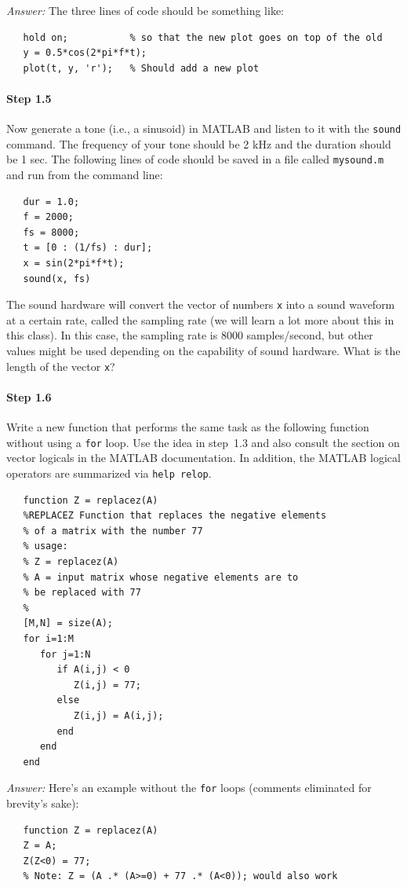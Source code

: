 \ifanswers
\textit{Answer:} The three lines of code should be something like:
\begin{verbatim}
   hold on;           % so that the new plot goes on top of the old
   y = 0.5*cos(2*pi*f*t);
   plot(t, y, 'r');   % Should add a new plot
\end{verbatim}
\fi

\paragraph{Step 1.5} Now generate a tone (i.e., a sinusoid) in MATLAB
and listen to it with the \texttt{sound} command. The frequency of
your tone should be 2 kHz and the duration should be 1 sec. The
following lines of code should be saved in a file called
\texttt{mysound.m} and run from the command line:
\begin{verbatim}
   dur = 1.0;
   f = 2000;
   fs = 8000;
   t = [0 : (1/fs) : dur];
   x = sin(2*pi*f*t);
   sound(x, fs)
\end{verbatim}
The sound hardware will convert the vector of numbers \texttt{x} into
a sound waveform at a certain rate, called the sampling rate (we will
learn a lot more about this in this class). In this case, the sampling
rate is 8000 samples/second, but other values might be used depending
on the capability of sound hardware. What is the length of the vector
\texttt{x}?

\paragraph{Step 1.6} Write a new function that performs the same task
as the following function without using a \texttt{for} loop. Use the
idea in step~1.3 and also consult the section on vector logicals in
the MATLAB documentation. In addition, the MATLAB logical operators
are summarized via \texttt{help relop}.
\begin{verbatim}
   function Z = replacez(A)
   %REPLACEZ Function that replaces the negative elements
   % of a matrix with the number 77
   % usage:
   % Z = replacez(A)
   % A = input matrix whose negative elements are to
   % be replaced with 77
   %
   [M,N] = size(A);
   for i=1:M
      for j=1:N
         if A(i,j) < 0
            Z(i,j) = 77;
         else
            Z(i,j) = A(i,j);
         end
      end
   end
\end{verbatim}

\ifanswers
\textit{Answer:} Here's an example without the \texttt{for} loops (comments
  eliminated for brevity's sake):
\begin{verbatim}
   function Z = replacez(A)
   Z = A;
   Z(Z<0) = 77;
   % Note: Z = (A .* (A>=0) + 77 .* (A<0)); would also work
\end{verbatim}
\fi


